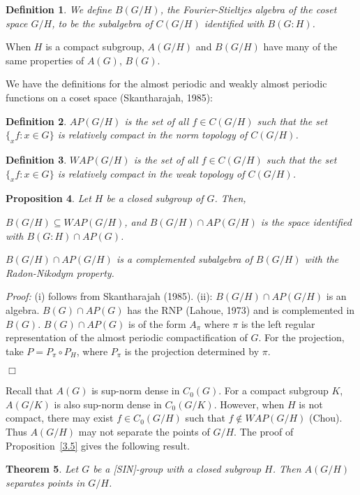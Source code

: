 \documentclass[12 pt]{article}
\newcommand\done{\begin{flushright}$\Box$\end{flushright}}
\newtheorem{defn}{Definition}
\newtheorem{theorem}[defn]{Theorem}
\newtheorem{prop}[defn]{Proposition}
\begin{document}
\begin{defn}
We define $B(G/H)$, the Fourier-Stieltjes algebra of the coset space $G/H$, to be
the subalgebra of $C(G/H)$ identified with $B(G:H)$.
\end{defn}

When $H$ is a compact subgroup, $A(G/H)$ and $B(G/H)$ have many of the same properties
of $A(G)$, $B(G)$.

We have the definitions for the almost periodic and weakly almost periodic
functions on a coset space (Skantharajah, 1985):

\begin{defn}
$AP(G/H)$ is the set of all $f\in C(G/H)$ such that the set $\{ _x f: x\in G\}$ is
relatively compact in the norm topology of $C(G/H)$.
\end{defn}

\begin{defn}
$WAP(G/H)$ is the set of all $f\in C(G/H)$ such that the set $\{ _x f: x\in G\}$ is
relatively compact in the weak topology of $C(G/H)$.
\end{defn}
\pagebreak
\begin{prop}
Let $H$ be a closed subgroup of $G$.  Then,
\begin{list}{}{\topsep -4pt \itemsep -4pt}
\item[(i)] $B(G/H)\subseteq WAP(G/H)$, and $B(G/H)\cap AP(G/H)$ is the space identified with
$B(G:H)\cap AP(G)$.
\item[(ii)] $B(G/H)\cap AP(G/H)$ is a complemented subalgebra of $B(G/H)$ with the Radon-Nikodym
property.
\end{list}
\end{prop}
{\it Proof:}
(i) follows from Skantharajah (1985).
(ii): $B(G/H)\cap AP(G/H)$ is an algebra.  $B(G)\cap AP(G)$ has the RNP
(Lahoue, 1973) and is complemented in $B(G)$.  $B(G)\cap AP(G)$ is of the form
$A_\pi$ where $\pi$ is the left regular representation of the almost periodic
compactification of $G$.  For the projection, take $P=P_\pi \circ P_H$, where
$P_\pi$ is the projection determined by $\pi$.\done


Recall that $A(G)$ is sup-norm dense in $C_0 (G)$.  For a compact subgroup $K$,
$A(G/K)$ is also sup-norm dense in $C_0 (G/K)$.  However, when $H$ is not compact,
there may exist $f\in C_0 (G/H)$ such that $f\not\in WAP(G/H)$ (Chou).  Thus $A(G/H)$ may
not separate the points of $G/H$.  The proof of Proposition~\ref{3.5} gives the following
result.
\begin{theorem}
Let $G$ be a [SIN]-group with a closed subgroup $H$.  Then $A(G/H)$ separates points in $G/H$.
\end{theorem}
\end{document}
